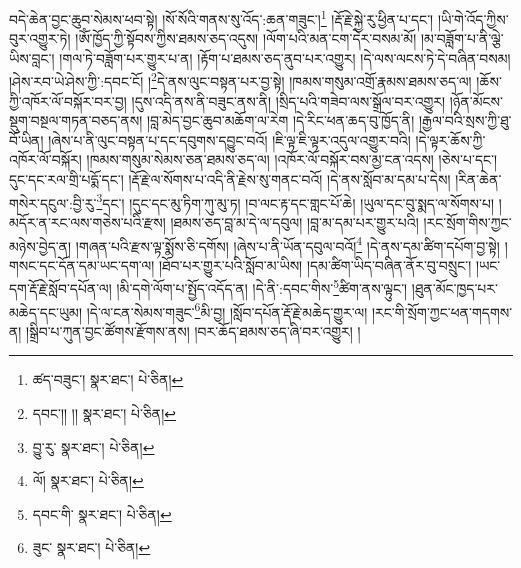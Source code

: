 བདེ་ཆེན་བྱང་ཆུབ་སེམས་ཕབ་སྟེ། །སོ་སོའི་གནས་སུ་འོད་:ཆན་གཟུང་།\footnote{ཚད་བཟུང་།  སྣར་ཐང་།  པེ་ཅིན། } །རྡོ་རྗེ་སྐྱེ་རུ་ཕྱིན་པ་དང་། །ཡི་གེ་འོད་ཀྱིས་བུར་འགྱུར་ཏེ། །ཨོཾ་ཁྱོད་ཀྱི་སྟོབས་ཀྱིས་ཐམས་ཅད་འདུས། །ལོག་པའི་མན་ངག་དེར་བསམ་མོ། །མ་བཟློག་པ་ནི་ལྕེ་ཡིས་བླང་། །གལ་ཏེ་བཟློག་པར་གྱུར་པ་ན། །རྟོག་པ་ཐམས་ཅད་ནུབ་པར་འགྱུར། །དེ་ལས་ལངས་ཏེ་དེ་བཞིན་བསམ། །ཤེས་རབ་ཡེ་ཤེས་ཀྱི་:དབང་ངོ། །\footnote{དབང་།། །།  སྣར་ཐང་།  པེ་ཅིན། }དེ་ནས་ལུང་བསྟན་པར་བྱ་སྟེ། །ཁམས་གསུམ་འགྲོ་རྣམས་ཐམས་ཅད་ལ། །ཆོས་ཀྱི་འཁོར་ལོ་བསྐོར་བར་བྱ། །དུས་འདི་ནས་ནི་བཟུང་ནས་ནི། །སྲིད་པའི་གཟེབ་ལས་སྒྲོལ་བར་འགྱུར། །ཉོན་མོངས་སྡུག་བསྔལ་གཏན་བཅད་ནས། །བླ་མེད་བྱང་ཆུབ་མཆོག་ལ་རེག །དེ་རིང་ཕན་ཆད་བུ་ཁྱོད་ནི། །རྒྱལ་བའི་སྲས་ཀྱི་ཐུ་བོ་ཡིན། །ཞེས་པ་ནི་ལུང་བསྟན་པ་དང་དབུགས་དབྱུང་བའོ། །ཇི་ལྟ་ཇི་ལྟར་འདུལ་འགྱུར་བའི། །དེ་ལྟར་ཆོས་ཀྱི་འཁོར་ལོ་བསྐོར། །ཁམས་གསུམ་སེམས་ཅན་ཐམས་ཅད་ལ། །འཁོར་ལོ་བསྐོར་བས་མྱ་ངན་འདས། །ཅེས་པ་དང་། དུང་དང་རལ་གྲི་པདྨོ་དང་། །རྡོ་རྗེ་ལ་སོགས་པ་འདི་ནི་རྗེས་སུ་གནང་བའོ། །དེ་ནས་སློབ་མ་དམ་པ་དེས། །རིན་ཆེན་གསེར་དངུལ་:བྱི་རུ་\footnote{བྱུ་རུ་  སྣར་ཐང་།  པེ་ཅིན། }དང་། །དུང་དང་མུ་ཏིག་ཀུ་མུ་ཏ། །བ་ལང་རྟ་དང་གླང་པོ་ཆེ། །ཡུལ་དང་བུ་སྨད་ལ་སོགས་པ། །མདོར་ན་རང་ལས་གཅེས་པའི་རྫས། །ཐམས་ཅད་བླ་མ་དེ་ལ་དབུལ། །བླ་མ་དམ་པར་གྱུར་པའི། །རང་སྲོག་གིས་ཀྱང་མཉེས་བྱེད་ན། །གཞན་པའི་རྫས་ལྟ་སྨོས་ཅི་དགོས། །ཞེས་པ་ནི་ཡོན་དབུལ་བའོ།\footnote{ལོ།  སྣར་ཐང་།  པེ་ཅིན། } །དེ་ནས་དམ་ཚིག་དཔོག་བྱ་སྟེ། །གསང་དང་དོན་དམ་ཡང་དག་ལ། །ཐོབ་པར་གྱུར་པའི་སློབ་མ་ཡིས། །དམ་ཚིག་ཡིད་བཞིན་ནོར་བུ་བསྲུང་། །ཡང་དག་རྡོ་རྗེ་སློབ་དཔོན་ལ། །མི་དགེ་ལོག་པ་སྤྱོད་འདོད་ན། །དེ་ནི་:དབང་གིས་\footnote{དབང་གི་  སྣར་ཐང་།  པེ་ཅིན། }ཚིག་ནས་ལྟུང་། །ཐུན་མོང་ཁྱད་པར་མཆེད་དང་ཡུམ། །དེ་ལ་ངན་སེམས་གཟུང་\footnote{ཟུང་  སྣར་ཐང་།  པེ་ཅིན། }མི་བྱ། །སློབ་དཔོན་རྡོ་རྗེ་མཆེད་གྱུར་ལ། །རང་གི་སྲོག་ཀྱང་ཕན་གདགས་ན། །སྒྲིབ་པ་ཀུན་བྱང་ཚོགས་རྫོགས་ནས། །བར་ཆོད་ཐམས་ཅད་ཞི་བར་འགྱུར། །
